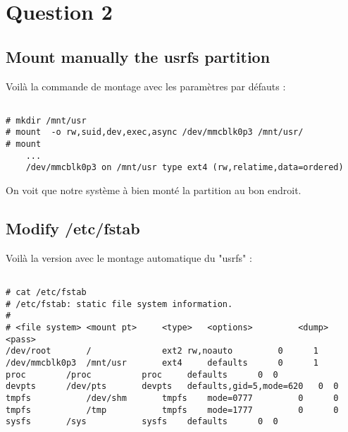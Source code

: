 
\chapter{Question 2} %

\label{Question 2} %


\section{Mount manually the usrfs partition}

Voilà la commande de montage avec les paramètres par défauts :

\begin{lstlisting}[frame=single,style=Console]  % Start your code-block

# mkdir /mnt/usr
# mount  -o rw,suid,dev,exec,async /dev/mmcblk0p3 /mnt/usr/
# mount
	...
	/dev/mmcblk0p3 on /mnt/usr type ext4 (rw,relatime,data=ordered)
\end{lstlisting}

On voit que notre système à bien monté la partition au bon endroit.

\section{Modify /etc/fstab }

Voilà la version avec le montage automatique du "usrfs" :

\begin{lstlisting}[frame=single,style=Console]  % Start your code-block

# cat /etc/fstab 
# /etc/fstab: static file system information.
#
# <file system> <mount pt>     <type>	<options>         <dump> <pass>
/dev/root       /              ext2	rw,noauto         0      1
/dev/mmcblk0p3	/mnt/usr       ext4     defaults	  0      1
proc		/proc	       proc     defaults	  0	 0
devpts		/dev/pts       devpts   defaults,gid=5,mode=620	  0	 0
tmpfs           /dev/shm       tmpfs    mode=0777         0      0
tmpfs           /tmp           tmpfs    mode=1777         0      0
sysfs		/sys	       sysfs    defaults	  0	 0
\end{lstlisting}


